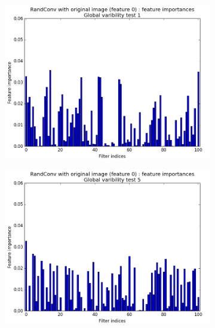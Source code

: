 \documentclass[a4paper]{report}
\begin{document}
		
		\begin{figure}
			\begin{subfigure}{.5\textwidth}
				\centering
				\includegraphics[width=1.\linewidth]{images/FIGVar1.png}
				\caption{\label{fig:FIGVar1}}
			\end{subfigure}%
			\begin{subfigure}{.5\textwidth}
				\centering
				\includegraphics[width=1.\linewidth]{images/FIGVar5.png}
				\caption{\label{fig:FIGVar5}}
			\end{subfigure}
			\begin{subfigure}{.5\textwidth}
				\centering

\end{subfigure}
\end{figure}
\end{document}
